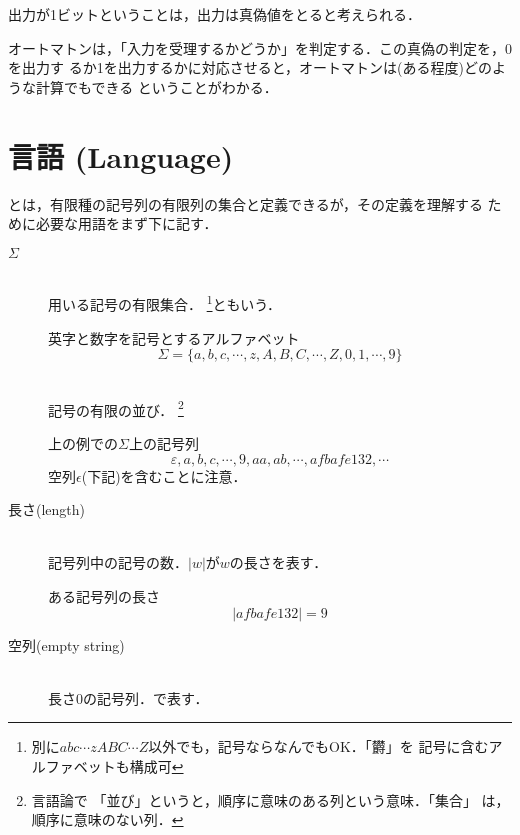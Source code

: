 出力が1ビットということは，出力は真偽値をとると考えられる．

オートマトンは，「入力を受理するかどうか」を判定する．この真偽の判定を，0を出力す
るか1を出力するかに対応させると，オートマトンは(ある程度)どのような計算でもできる
ということがわかる．

\section{言語 (Language)}
とは，有限種の記号列の有限列の集合と定義できるが，その定義を理解する
ために必要な用語をまず下に記す．

\begin{description}
 \item [$\Sigma$] \mbox{} \\
 用いる記号の有限集合．
       \footnote{別に$abc\cdots zABC\cdots Z$以外でも，記号ならなんでもOK．「欝」を
       記号に含むアルファベットも構成可}ともいう．
             \begin{myexample}{英字と数字を記号とするアルファベット}
              \[
              \Sigma = \{a,b,c,\cdots ,z,A,B,C,\cdots ,Z,0,1,\cdots ,9\}
              \]
             \end{myexample}

 \item [] \mbox{} \\
 記号の有限の並び． \footnote{言語論で
             「並び」というと，順序に意味のある列という意味．「集合」
             は，順序に意味のない列．}
             \begin{myexample}{上の例での$\Sigma$上の記号列}
              \[
              \varepsilon, a, b, c, \cdots , 9, aa, ab, \cdots  ,afbafe132, \cdots 
              \]
              空列$\epsilon$(下記)を含むことに注意．
             \end{myexample}

 \item[長さ(length)] \mbox{} \\
            記号列中の記号の数．$|w|$が$w$の長さを表す．
            \begin{myexample}{ある記号列の長さ}
             \[
              |afbafe132| = 9
             \]
            \end{myexample}

 \item[空列(empty string)] \mbox{} \\
長さ0の記号列．\mystrong{$\varepsilon$}で表す．
\end{description}

